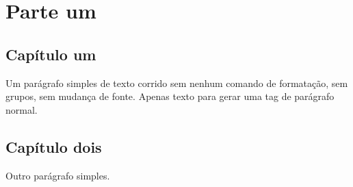 \documentclass[11pt,a5paper,twoside,openany]{book}
\begin{document}
\mainmatter

\part{Parte um}

\chapter{Capítulo um}

Um parágrafo simples de texto corrido sem nenhum comando de
formatação, sem grupos, sem mudança de fonte. Apenas texto
para gerar uma tag de parágrafo normal.

\chapter{Capítulo dois}

Outro parágrafo simples.
\end{document}
